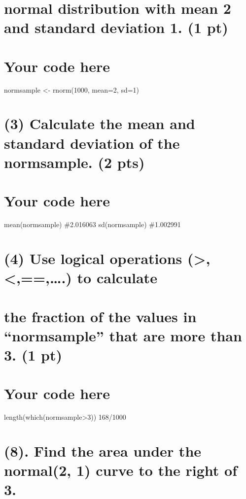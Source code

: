 \documentclass[]{article}
\begin{document}
\section{normal distribution with mean 2 and standard deviation 1. (1
pt)}\label{normal-distribution-with-mean-2-and-standard-deviation-1.-1-pt}

\section{Your code here}\label{your-code-here-1}

normsample \textless{}- rnorm(1000, mean=2, sd=1)

\section{(3) Calculate the mean and standard deviation of the
normsample. (2
pts)}\label{calculate-the-mean-and-standard-deviation-of-the-normsample.-2-pts}

\section{Your code here}\label{your-code-here-2}

mean(normsample) \#2.016063 sd(normsample) \#1.002991

\section{(4) Use logical operations
(\textgreater{},\textless{},==,\ldots{}.) to
calculate}\label{use-logical-operations-.-to-calculate}

\section{\texorpdfstring{the fraction of the values in ``normsample''
that are more than 3. (1
pt)}{the fraction of the values in normsample that are more than 3. (1 pt)}}\label{the-fraction-of-the-values-in-normsample-that-are-more-than-3.-1-pt}

\section{Your code here}\label{your-code-here-3}

length(which(normsample\textgreater{}3)) 168/1000

\section{(8). Find the area under the normal(2, 1) curve to the right of
3.}\label{find-the-area-under-the-normal2-1-curve-to-the-right-of-3.}
\end{document}

